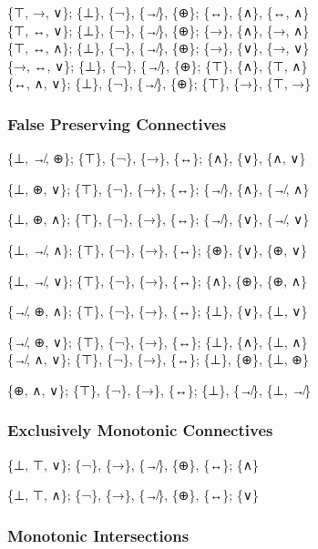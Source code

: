 \{⊤, →, ∨\}; \{⊥\}, \{¬\}, \{↛\}, \{⊕\}; \{↔\}, \{∧\}, \{↔, ∧\}\\
\{⊤, ↔, ∨\}; \{⊥\}, \{¬\}, \{↛\}, \{⊕\}; \{→\}, \{∧\}, \{→, ∧\}\\
\{⊤, ↔, ∧\}; \{⊥\}, \{¬\}, \{↛\}, \{⊕\}; \{→\}, \{∨\}, \{→, ∨\}\\
\{→, ↔, ∨\}; \{⊥\}, \{¬\}, \{↛\}, \{⊕\}; \{⊤\}, \{∧\}, \{⊤, ∧\}\\
\{↔, ∧, ∨\}; \{⊥\}, \{¬\}, \{↛\}, \{⊕\}; \{⊤\}, \{→\}, \{⊤, →\}

\hypertarget{false-preserving-connectives}{%
\subsubsection{False Preserving
Connectives}\label{false-preserving-connectives}}

\{⊥, ↛, ⊕\}; \{⊤\}, \{¬\}, \{→\}, \{↔\}; \{∧\}, \{∨\}, \{∧, ∨\}

\{⊥, ⊕, ∨\}; \{⊤\}, \{¬\}, \{→\}, \{↔\}; \{↛\}, \{∧\}, \{↛, ∧\}

\{⊥, ⊕, ∧\}; \{⊤\}, \{¬\}, \{→\}, \{↔\}; \{↛\}, \{∨\}, \{↛, ∨\}

\{⊥, ↛, ∧\}; \{⊤\}, \{¬\}, \{→\}, \{↔\}; \{⊕\}, \{∨\}, \{⊕, ∨\}

\{⊥, ↛, ∨\}; \{⊤\}, \{¬\}, \{→\}, \{↔\}; \{∧\}, \{⊕\}, \{⊕, ∧\}

\{↛, ⊕, ∧\}; \{⊤\}, \{¬\}, \{→\}, \{↔\}; \{⊥\}, \{∨\}, \{⊥, ∨\}

\{↛, ⊕, ∨\}; \{⊤\}, \{¬\}, \{→\}, \{↔\}; \{⊥\}, \{∧\}, \{⊥, ∧\}\\
\{↛, ∧, ∨\}; \{⊤\}, \{¬\}, \{→\}, \{↔\}; \{⊥\}, \{⊕\}, \{⊥, ⊕\}

\{⊕, ∧, ∨\}; \{⊤\}, \{¬\}, \{→\}, \{↔\}; \{⊥\}, \{↛\}, \{⊥, ↛\}

\hypertarget{exclusively-monotonic-connectives}{%
\subsubsection{\texorpdfstring{Exclusively Monotonic Connectives
}{Exclusively Monotonic Connectives }}\label{exclusively-monotonic-connectives}}

\{⊥, ⊤, ∨\}; \{¬\}, \{→\}, \{↛\}, \{⊕\}, \{↔\}; \{∧\}

\{⊥, ⊤, ∧\}; \{¬\}, \{→\}, \{↛\}, \{⊕\}, \{↔\}; \{∨\}

\hypertarget{monotonic-intersections}{%
\subsubsection{Monotonic Intersections}\label{monotonic-intersections}}

